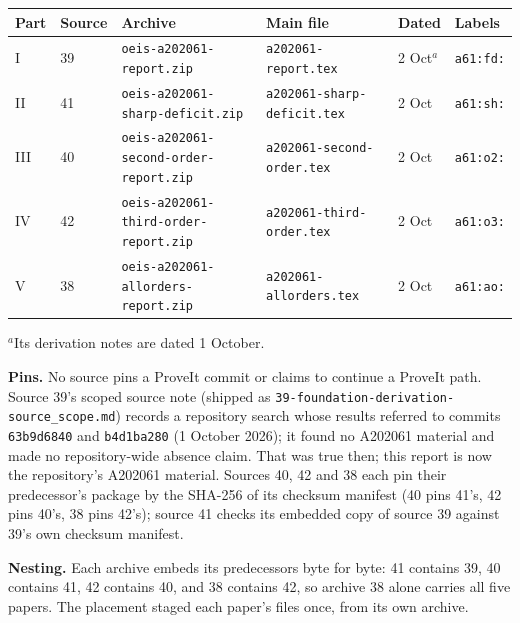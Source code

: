 \documentclass[11pt,letterpaper]{article}
\numberwithin{equation}{section}
\theoremstyle{remark}\newtheorem{remark}[theorem]{Remark}
\begin{document}
\begin{center}
\footnotesize\setlength{\tabcolsep}{4pt}
\begin{tabular}{@{}llllll@{}}
\toprule
Part & Source & Archive & Main file & Dated & Labels\\
\midrule
I & 39 & \texttt{oeis-a202061-report.zip} & \texttt{a202061-report.tex} & 2 Oct$^{a}$ & \texttt{a61:fd:}\\
II & 41 & \texttt{oeis-a202061-sharp-deficit.zip} & \texttt{a202061-sharp-deficit.tex} & 2 Oct & \texttt{a61:sh:}\\
III & 40 & \texttt{oeis-a202061-second-order-report.zip} & \texttt{a202061-second-order.tex} & 2 Oct & \texttt{a61:o2:}\\
IV & 42 & \texttt{oeis-a202061-third-order-report.zip} & \texttt{a202061-third-order.tex} & 2 Oct & \texttt{a61:o3:}\\
V & 38 & \texttt{oeis-a202061-allorders-report.zip} & \texttt{a202061-allorders.tex} & 2 Oct & \texttt{a61:ao:}\\
\bottomrule
\end{tabular}

\smallskip $^{a}$Its derivation notes are dated 1 October.
\end{center}

\noindent\textbf{Pins.} No source pins a ProveIt commit or claims to continue a ProveIt path. Source 39's scoped source note (shipped as \texttt{39-foundation-derivation-source\_scope.md}) records a repository search whose results referred to commits \texttt{63b9d6840} and \texttt{b4d1ba280} (1 October 2026); it found no A202061 material and made no repository-wide absence claim. That was true then; this report is now the repository's A202061 material. Sources 40, 42 and 38 each pin their predecessor's package by the SHA-256 of its checksum manifest (40 pins 41's, 42 pins 40's, 38 pins 42's); source 41 checks its embedded copy of source 39 against 39's own checksum manifest.

\noindent\textbf{Nesting.} Each archive embeds its predecessors byte for byte: 41 contains 39, 40 contains 41, 42 contains 40, and 38 contains 42, so archive 38 alone carries all five papers. The placement staged each paper's files once, from its own archive.
\end{document}
